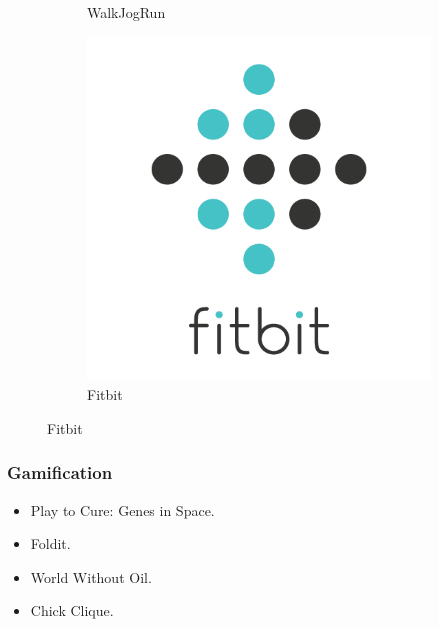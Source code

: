 \documentclass{beamer}
\begin{document}
\begin{frame}
\begin{figure}[h]
\begin{subfigure}[b]{0.3\textwidth}
      \caption{WalkJogRun}
    \end{subfigure}
    \hspace{0.02\textwidth}
    \begin{subfigure}[b]{0.3\textwidth}
      \includegraphics[width=\textwidth]{images/fitbit.png}
      \caption{Fitbit}
    \end{subfigure}
  \end{figure}  

\end{frame}

\begin{frame}
  \frametitle{Gamification}
  \begin{itemize}
  \item Play to Cure: Genes in Space.
  \item Foldit.
  \item World Without Oil.
  \item Chick Clique.
  \end{itemize}
\end{frame}
\end{document}
